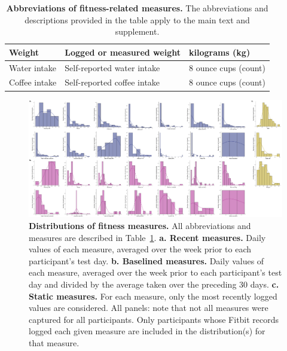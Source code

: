 \documentclass[10pt]{article}
\begin{document}
\begin{table}[]
{\begin{tabular}{p{1.5in}p{4in}p{1.5in}}
  \hline
Weight                  & Logged or measured weight                                                                                                                                                            & kilograms (kg)                           \\
  \hline
Water intake            & Self-reported water intake                                                                                                                                                           & 8 ounce cups (count)                     \\
  \hline
Coffee intake           & Self-reported coffee intake                                                                                                                                                          & 8 ounce cups (count)                    
\end{tabular}%
}
\caption{\textbf{Abbreviations of fitness-related measures.}  The
  abbreviations and descriptions provided in the table apply to the
  main text and supplement.}
\label{tab:abbreviations}
\end{table}

\begin{figure}
\centering
\includegraphics[width=\textwidth]{figs/fitness_distributions}
\caption{\textbf{Distributions of fitness measures.}  All
  abbreviations and measures are described in
  Table~\ref{tab:abbreviations}.  \textbf{a. Recent measures.}
  Daily values of each measure, averaged over the week prior to each
  participant's test day.  \textbf{b. Baselined measures.}  Daily
  values of each measure, averaged over the week prior to each
  participant's test day and divided by the average taken over the
  preceding 30 days.  \textbf{c. Static measures.} For each measure,
  only the most recently logged values are considered.  All panels:
  note that not all measures were captured for all participants.  Only
participants whose Fitbit records logged each given measure are
included in the distribution(s) for that measure.}
\label{fig:fitness_dists}
\end{figure}
\end{document}
